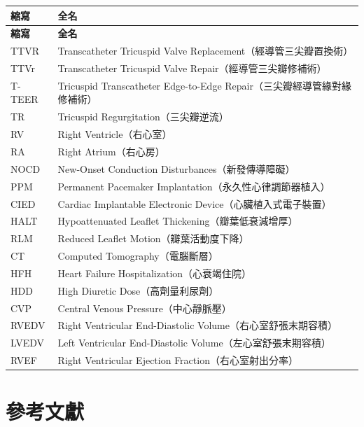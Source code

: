 \documentclass[12pt,a4paper]{article}
\begin{document}
\begin{longtable}{p{3.5cm}p{11cm}}
\toprule
\textbf{縮寫} & \textbf{全名} \\
\midrule
\endfirsthead
\midrule
\textbf{縮寫} & \textbf{全名} \\
\midrule
\endhead
\bottomrule
\endfoot

TTVR & Transcatheter Tricuspid Valve Replacement（經導管三尖瓣置換術）\\
TTVr & Transcatheter Tricuspid Valve Repair（經導管三尖瓣修補術）\\
T-TEER & Tricuspid Transcatheter Edge-to-Edge Repair（三尖瓣經導管緣對緣修補術）\\
TR & Tricuspid Regurgitation（三尖瓣逆流）\\
RV & Right Ventricle（右心室）\\
RA & Right Atrium（右心房）\\
NOCD & New-Onset Conduction Disturbances（新發傳導障礙）\\
PPM & Permanent Pacemaker Implantation（永久性心律調節器植入）\\
CIED & Cardiac Implantable Electronic Device（心臟植入式電子裝置）\\
HALT & Hypoattenuated Leaflet Thickening（瓣葉低衰減增厚）\\
RLM & Reduced Leaflet Motion（瓣葉活動度下降）\\
CT & Computed Tomography（電腦斷層）\\
HFH & Heart Failure Hospitalization（心衰竭住院）\\
HDD & High Diuretic Dose（高劑量利尿劑）\\
CVP & Central Venous Pressure（中心靜脈壓）\\
RVEDV & Right Ventricular End-Diastolic Volume（右心室舒張末期容積）\\
LVEDV & Left Ventricular End-Diastolic Volume（左心室舒張末期容積）\\
RVEF & Right Ventricular Ejection Fraction（右心室射出分率）\\

\end{longtable}

\section{參考文獻}
\end{document}
